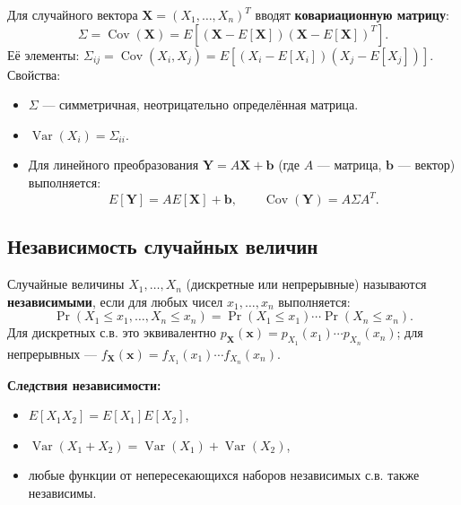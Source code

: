 \documentclass[10pt]{article}
\begin{document}
\begin{remark}
Для случайного вектора $\mathbf{X} = (X_1, \dots, X_n)^T$ вводят \textbf{ковариационную матрицу}:
\[
\Sigma = \operatorname{Cov}(\mathbf{X}) = E[(\mathbf{X} - E[\mathbf{X}])(\mathbf{X} - E[\mathbf{X}])^T].
\]
Её элементы: $\Sigma_{ij} = \operatorname{Cov}(X_i, X_j) = E[(X_i - E[X_i])(X_j - E[X_j])]$.
Свойства:
\begin{itemize}
    \item $\Sigma$ — симметричная, неотрицательно определённая матрица.
    \item $\operatorname{Var}(X_i) = \Sigma_{ii}$.
    \item Для линейного преобразования $\mathbf{Y} = A\mathbf{X} + \mathbf{b}$ (где $A$ — матрица, $\mathbf{b}$ — вектор) выполняется:
    \[
    E[\mathbf{Y}] = A E[\mathbf{X}] + \mathbf{b}, \qquad \operatorname{Cov}(\mathbf{Y}) = A \Sigma A^T.
    \]
\end{itemize}
    
\end{remark}

\subsection{Независимость случайных величин}
\begin{definition}
Случайные величины $X_1, \dots, X_n$ (дискретные или непрерывные) называются \textbf{независимыми}, если для любых чисел $x_1, \dots, x_n$ выполняется:
\[
\Pr(X_1 \le x_1, \dots, X_n \le x_n) = \Pr(X_1 \le x_1) \cdots \Pr(X_n \le x_n).
\]
Для дискретных с.в. это эквивалентно $p_{\mathbf{X}}(\mathbf{x}) = p_{X_1}(x_1) \cdots p_{X_n}(x_n)$; для непрерывных — $f_{\mathbf{X}}(\mathbf{x}) = f_{X_1}(x_1) \cdots f_{X_n}(x_n)$.
\end{definition}

\textbf{Следствия независимости:}
\begin{itemize}
    \item $E[X_1 X_2] = E[X_1]E[X_2]$,
    \item $\operatorname{Var}(X_1 + X_2) = \operatorname{Var}(X_1) + \operatorname{Var}(X_2)$,
    \item любые функции от непересекающихся наборов независимых с.в. также независимы.
\end{itemize}
\end{document}
